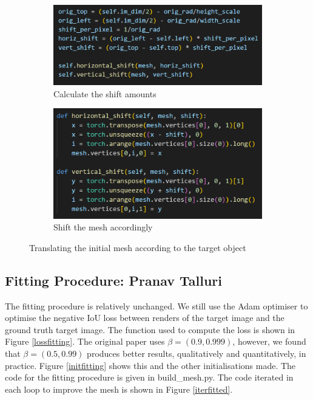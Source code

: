 \documentclass{article}
\begin{document}
\begin{figure}[h!]
  \centering
  \begin{subfigure}{0.55\textwidth}
    \centering
    \includegraphics[width=\textwidth]{images/shift_a.png}
    \caption{Calculate the shift amounts}
  \end{subfigure}
  \hfill
  \begin{subfigure}{0.4\textwidth}
    \centering
    \includegraphics[width=\textwidth]{images/shift_b.png}
    \caption{Shift the mesh accordingly}
  \end{subfigure}
  \caption{Translating the initial mesh according to the target object}
  \label{shiftcode}
\end{figure}

\newpage
\subsection{Fitting Procedure: Pranav Talluri}

The fitting procedure is relatively unchanged. We still use the Adam optimiser to optimise the negative IoU loss between renders of the target image and the ground truth target image. The function used to compute the loss is shown in Figure \ref{lossfitting}. The original paper uses $\beta = (0.9, 0.999)$, however, we found that $\beta = (0.5, 0.99)$ produces better results, qualitatively and quantitatively, in practice. Figure \ref{initfitting} shows this and the other initialisations made. The code for the fitting procedure is given in build\_mesh.py. The code iterated in each loop to improve the mesh is shown in Figure \ref{iterfitted}.
\end{document}

